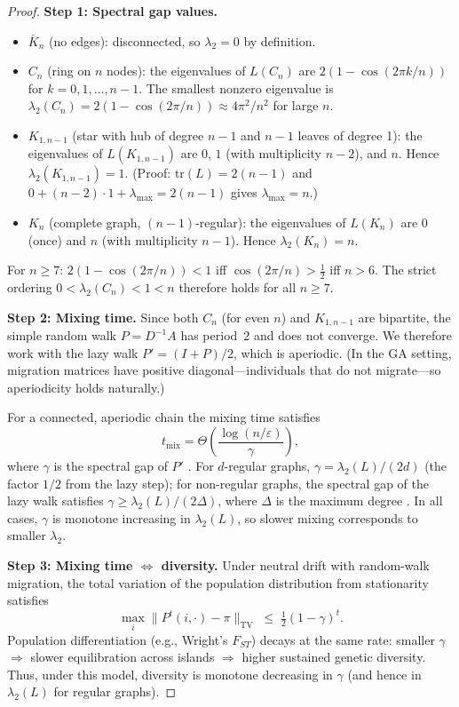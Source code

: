 \documentclass[10pt]{article}
\theoremstyle{remark}
\begin{document}
\begin{proof}
\textbf{Step 1: Spectral gap values.}
\begin{itemize}
  \item $\bar{K}_n$ (no edges): disconnected, so $\lambda_2 = 0$ by
    definition.
  \item $C_n$ (ring on $n$ nodes): the eigenvalues of $L(C_n)$ are
    $2(1 - \cos(2\pi k/n))$ for $k = 0, 1, \ldots, n-1$. The smallest
    nonzero eigenvalue is
    $\lambda_2(C_n) = 2(1 - \cos(2\pi/n)) \approx 4\pi^2/n^2$
    for large $n$.
  \item $K_{1,n-1}$ (star with hub of degree $n-1$ and $n-1$ leaves of
    degree 1): the eigenvalues of $L(K_{1,n-1})$ are $0$, $1$ (with
    multiplicity $n-2$), and $n$. Hence $\lambda_2(K_{1,n-1}) = 1$.
    (Proof: $\mathrm{tr}(L) = 2(n-1)$ and $0 + (n-2)\cdot 1 + \lambda_{\max} = 2(n-1)$
    gives $\lambda_{\max} = n$.)
  \item $K_n$ (complete graph, $(n-1)$-regular): the eigenvalues of
    $L(K_n)$ are $0$ (once) and $n$ (with multiplicity $n-1$). Hence
    $\lambda_2(K_n) = n$.
\end{itemize}

For $n \geq 7$: $2(1 - \cos(2\pi/n)) < 1$ iff $\cos(2\pi/n) > \tfrac{1}{2}$
iff $n > 6$. The strict ordering $0 < \lambda_2(C_n) < 1 < n$ therefore
holds for all $n \geq 7$.

\textbf{Step 2: Mixing time.}
Since both $C_n$ (for even $n$) and $K_{1,n-1}$ are bipartite, the simple
random walk $P = D^{-1}A$ has period~2 and does not converge. We therefore
work with the lazy walk $P' = (I + P)/2$, which is aperiodic. (In the GA
setting, migration matrices have positive diagonal---individuals that do not
migrate---so aperiodicity holds naturally.)

For a connected, aperiodic chain the mixing time satisfies
\[
  t_{\mathrm{mix}} = \Theta\!\left(\frac{\log(n/\varepsilon)}{\gamma}\right),
\]
where $\gamma$ is the spectral gap of $P'$
\cite{LevinPeresWilmer2009}. For $d$-regular graphs,
$\gamma = \lambda_2(L)/(2d)$ (the factor $1/2$ from the lazy step); for
non-regular graphs, the spectral gap of the lazy walk satisfies
$\gamma \geq \lambda_2(L)/(2\Delta)$, where $\Delta$ is the maximum degree
\cite{LevinPeresWilmer2009}. In all cases, $\gamma$ is monotone increasing
in $\lambda_2(L)$, so slower mixing corresponds to smaller $\lambda_2$.

\textbf{Step 3: Mixing time $\Leftrightarrow$ diversity.}
Under neutral drift with random-walk migration, the total variation of the
population distribution from stationarity satisfies
\[
  \max_i \bigl\| P^t(i, \cdot) - \pi \bigr\|_{\mathrm{TV}}
  \;\leq\; \tfrac{1}{2}(1 - \gamma)^t.
\]
Population differentiation (e.g., Wright's $F_{ST}$) decays at the same
rate: smaller $\gamma$ $\Rightarrow$ slower equilibration across islands
$\Rightarrow$ higher sustained genetic diversity. Thus, under this model,
diversity is monotone decreasing in $\gamma$ (and hence in $\lambda_2(L)$
for regular graphs).


\end{proof}
\end{document}
